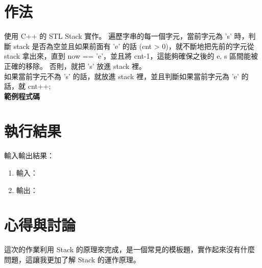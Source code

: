 \documentclass[12pt, a4paper]{article}
\begin{document}
  \section{\fontsize{20pt}{22pt}\selectfont 作法}
  \begin{samepage}
    \fontsize{16pt}{18pt} \selectfont
      使用 C++ 的 STL Stack 實作。
      遍歷字串的每一個字元，當前字元為 's' 時，判斷 stack 是否為空並且如果前面有 'e' 的話 (cnt > 0)，就不斷地把先前的字元從 stack 拿出來，直到 now == 'e'，並且將 cnt-1，這能夠確保之後的 e, s 區間能被正確的移除。
      否則，就把 's' 放進 stack 裡。 \\
      如果當前字元不為 's' 的話，就放進 stack 裡，並且判斷如果當前字元為 'e' 的話，就 cnt++;\\
      \textbf{範例程式碼}  
    
    \normalfont
  \end{samepage}

  \section{\fontsize{20pt}{22pt}\selectfont 執行結果}
      \fontsize{16pt}{18pt} \selectfont
        輸入輸出結果：
        \begin{enumerate}
          \item 輸入：
            
          \item 輸出：
            
        \end{enumerate}
      \normalsize

  \section{\fontsize{20pt}{22pt}\selectfont 心得與討論}
  \begin{samepage}
    \fontsize{16pt}{18pt} \selectfont
      這次的作業利用 Stack 的原理來完成，是一個常見的模板題，實作起來沒有什麼問題，這讓我更加了解 Stack 的運作原理。
    \normalfont
  \end{samepage}
\end{document}

